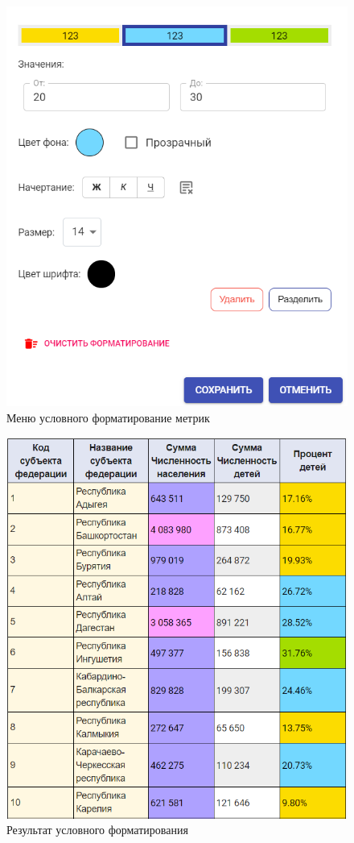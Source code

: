 \documentclass[../user-manual.tex]{subfiles}
\begin{document}
	\begin{figure}[h]
		\centering
		\includegraphics[width=\graphicswidth]{img/18-conditional-format.png}
		\caption{Меню условного форматирование метрик}
		\label{fig:conditional-format-2}
	\end{figure}

	\begin{figure}[h]
		\centering
		\includegraphics[width=\graphicswidth]{img/19-conditional-format.png}
		\caption{Результат условного форматирования}
		\label{fig:conditional-format-3}
	\end{figure}
\end{document}
